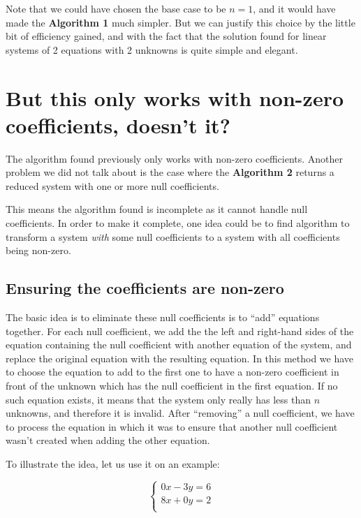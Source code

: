 \documentclass[11pt]{article}
\begin{document}
Note that we could have chosen the base case to be $n = 1$, and it would have made the \textbf{Algorithm 1} much simpler.
But we can justify this choice by the little bit of efficiency gained, and with the fact that the solution found for linear systems of 2 equations with 2 unknowns is quite simple and elegant.

\section{But this only works with non-zero coefficients, doesn't it?}

The algorithm found previously only works with non-zero coefficients.
Another problem we did not talk about is the case where the \textbf{Algorithm 2} returns a reduced system with one or more null coefficients.

This means the algorithm found is incomplete as it cannot handle null coefficients.
In order to make it complete, one idea could be to find algorithm to transform a system \textit{with} some null coefficients to a system with all coefficients being non-zero.

\subsection{Ensuring the coefficients are non-zero}

The basic idea is to eliminate these null coefficients is to ``add'' equations together.
For each null coefficient, we add the the left and right-hand sides of the equation containing the null coefficient with another equation of the system, and replace the original equation with the resulting equation.
In this method we have to choose the equation to add to the first one to have a non-zero coefficient in front of the unknown which has the null coefficient in the first equation.
If no such equation exists, it means that the system only really has less than $n$ unknowns, and therefore it is invalid.
After ``removing'' a null coefficient, we have to process the equation in which it was to ensure that another null coefficient wasn't created when adding the other equation.

To illustrate the idea, let us use it on an example:

\[
\begin{cases}
    0x - 3y = 6\\
    8x + 0y = 2\\
\end{cases}
\]
\end{document}
